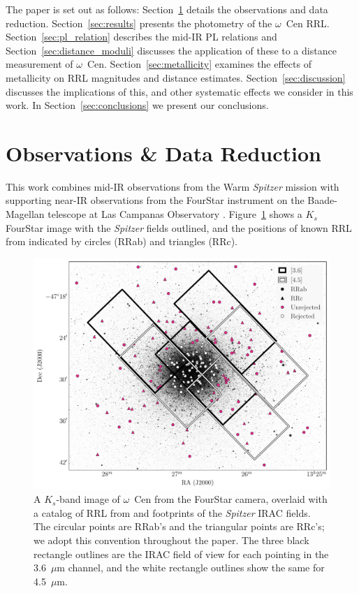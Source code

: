 \documentclass[a4paper,fleqn,usenatbib]{mnras}
\begin{document}
%
The paper is set out as follows: Section~\ref{sec:observations} details the observations and data reduction. Section~\ref{sec:results} presents the photometry of the $\omega$~Cen RRL. Section~\ref{sec:pl_relation} describes the mid-IR PL relations and Section~\ref{sec:distance_moduli} discusses the application of these to a distance measurement of  $\omega$~Cen. Section~\ref{sec:metallicity} examines the effects of metallicity on RRL magnitudes and distance estimates. Section~\ref{sec:discussion} discusses the implications of this, and other systematic effects we consider in this work. In Section~\ref{sec:conclusions} we present our conclusions.

\section{Observations \& Data Reduction}
\label{sec:observations}
This work combines mid-IR observations from the Warm {\it Spitzer} mission \citep[][PID 90002]{2012sptz.prop90002F} with supporting near-IR observations from the FourStar instrument on the Baade-Magellan telescope at Las Campanas Observatory \citep{2013PASP..125..654P}. Figure~\ref{fig:omegaCen_fields} shows a $K_s$ FourStar image with the {\it Spitzer} fields outlined, and the positions of known RRL from \citet{2004A&A...424.1101K} indicated by circles (RRab) and triangles (RRc). 

\begin{figure}
\begin{center}
\includegraphics[width=160mm, trim=1cm 0 1cm 0]{reworked_fitting_code/final_plots/omegacen_coverage_map_new.pdf}
\caption{A $K_s$-band image of $\omega$~Cen from the FourStar camera, overlaid with a catalog of RRL from \citet{2004A&A...424.1101K} and footprints of the {\it Spitzer} IRAC fields. The circular points are RRab's and the triangular points are RRc's; we adopt this convention throughout the paper. The three black rectangle outlines are the IRAC field of view for each pointing in the 3.6~$\mu$m channel, and the white rectangle outlines show the same for 4.5~$\mu$m.} 
\label{fig:omegaCen_fields}
\end{center}
\end{figure}
\end{document}
